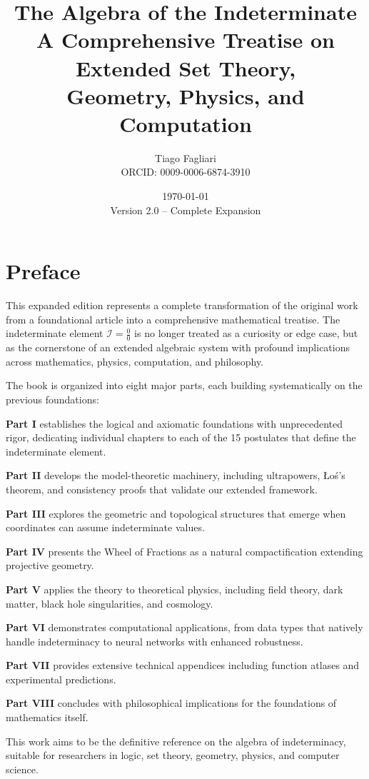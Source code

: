 \documentclass[12pt,a4paper,twoside,openright]{book}
\title{%
    \Huge\bfseries The Algebra of the Indeterminate\\[0.5cm]
    \Large A Comprehensive Treatise on Extended Set Theory,\\
    Geometry, Physics, and Computation}
\author{Tiago Fagliari\\ORCID: 0009-0006-6874-3910}
\date{\today\\[1cm]Version 2.0 -- Complete Expansion}
\theoremstyle{definition}
\theoremstyle{remark}
\newcommand{\I}{\mathcal{I}}
\begin{document}
\frontmatter
\maketitle

\tableofcontents
\listoffigures
\listoftables

\chapter{Preface}

This expanded edition represents a complete transformation of the original work from a foundational article into a comprehensive mathematical treatise. The indeterminate element $\I = \frac{0}{0}$ is no longer treated as a curiosity or edge case, but as the cornerstone of an extended algebraic system with profound implications across mathematics, physics, computation, and philosophy.

The book is organized into eight major parts, each building systematically on the previous foundations:

\textbf{Part I} establishes the logical and axiomatic foundations with unprecedented rigor, dedicating individual chapters to each of the 15 postulates that define the indeterminate element.

\textbf{Part II} develops the model-theoretic machinery, including ultrapowers, Łoś's theorem, and consistency proofs that validate our extended framework.

\textbf{Part III} explores the geometric and topological structures that emerge when coordinates can assume indeterminate values.

\textbf{Part IV} presents the Wheel of Fractions as a natural compactification extending projective geometry.

\textbf{Part V} applies the theory to theoretical physics, including field theory, dark matter, black hole singularities, and cosmology.

\textbf{Part VI} demonstrates computational applications, from data types that natively handle indeterminacy to neural networks with enhanced robustness.

\textbf{Part VII} provides extensive technical appendices including function atlases and experimental predictions.

\textbf{Part VIII} concludes with philosophical implications for the foundations of mathematics itself.

This work aims to be the definitive reference on the algebra of indeterminacy, suitable for researchers in logic, set theory, geometry, physics, and computer science.
\end{document}
